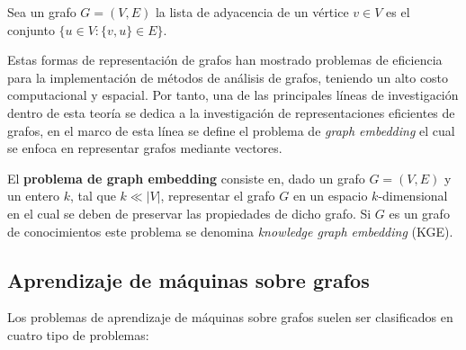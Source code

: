 \begin{definition}
    Sea un grafo $G = (V,E)$ la lista de adyacencia de un v\'ertice $v \in V$ es el conjunto
    $\{ u \in V : \{v,u\} \in E \}$.
\end{definition}

Estas formas de representaci\'on de grafos han mostrado problemas de eficiencia
para la implementaci\'on de m\'etodos de an\'alisis de grafos, teniendo un
alto costo computacional y espacial. Por tanto, una de las principales l\'ineas de
investigaci\'on dentro de esta teor\'ia se dedica a la investigaci\'on de representaciones eficientes de grafos,
en el marco de esta l\'inea se define el problema de \textit{graph embedding} el cual se enfoca en representar
grafos mediante vectores.

\begin{definition}
    El \textbf{problema de graph embedding} consiste en, dado un grafo
    $G = (V,E)$ y un entero $k$, tal que $k \ll |V|$, representar el
    grafo $G$ en un espacio $k$-dimensional en el cual se deben de preservar
    las propiedades de dicho grafo. Si $G$ es un grafo de conocimientos este problema
    se denomina \textit{knowledge graph embedding} (KGE).
\end{definition}

\subsection{Aprendizaje de m\'aquinas sobre grafos}
Los problemas de aprendizaje de m\'aquinas sobre grafos suelen ser 
clasificados en cuatro tipo de problemas:

